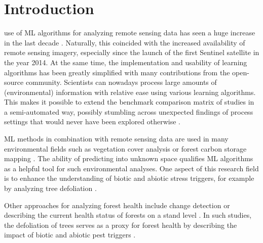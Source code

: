 \documentclass[journal]{IEEEtran}
\begin{document}
\section{Introduction}


 use of \ac{ML} algorithms for analyzing remote sensing data has seen a huge increase in the last decade \cite{lary2016}.
Naturally, this coincided with the increased availability of remote sensing imagery, especially since the launch of the first Sentinel satellite in the year 2014.
At the same time, the implementation and usability of learning algorithms has been greatly simplified with many contributions from the open-source community.
Scientists can nowadays process large amounts of (environmental) information with relative ease using various learning algorithms.
This makes it possible to extend the benchmark comparison matrix of studies in a semi-automated way, possibly stumbling across unexpected findings of process settings that would never have been explored otherwise \cite{ma2015}.


ML methods in combination with remote sensing data are used in many environmental fields such as vegetation cover analysis or forest carbon storage mapping \cite{mascaro2014, urban2018}.
The ability of predicting into unknown space qualifies ML algorithms as a helpful tool for such environmental analyses.
One aspect of this research field is to enhance the understanding of biotic and abiotic stress triggers, for example by analyzing tree defoliation \cite{hawrylo2018}.

Other approaches for analyzing forest health include change detection \cite{zhang2016} or describing the current health status of forests on a stand level \cite{townsend2012}.
In such studies, the defoliation of trees serves as a proxy for forest health by describing the impact of biotic and abiotic pest triggers \cite{townsend2012, goodbody2018}.
\end{document}
